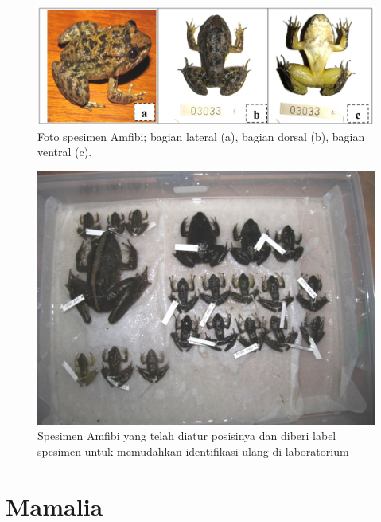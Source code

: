 \documentclass[
]{book}
\begin{document}
\begin{figure}

{\centering \includegraphics[width=1\linewidth]{images/spesimenafmibi1} 

}

\caption{Foto spesimen Amfibi; bagian lateral (a), bagian dorsal (b), bagian ventral (c).}\label{fig:spesamf1}
\end{figure}

\begin{figure}

{\centering \includegraphics[width=1\linewidth]{images/spesimenafmibi2} 

}

\caption{Spesimen Amfibi yang telah diatur posisinya dan diberi label spesimen untuk memudahkan identifikasi ulang di laboratorium}\label{fig:spesamf2}
\end{figure}

\hypertarget{mamalia-1}{%
\section*{Mamalia}\label{mamalia-1}}
\end{document}
